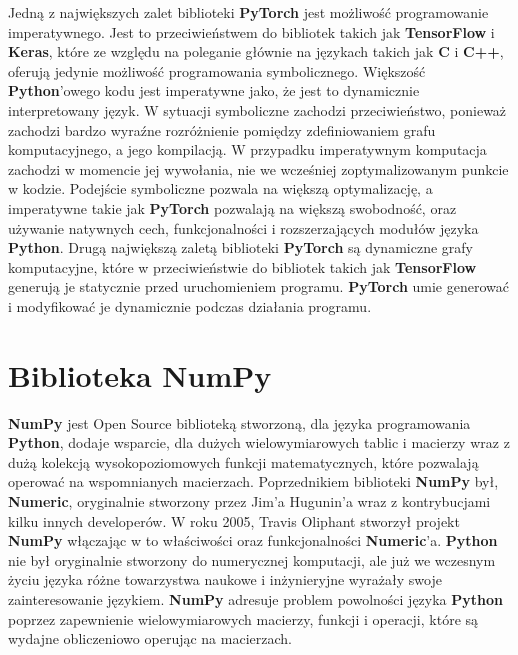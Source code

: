 Jedną z największych zalet biblioteki \textbf{PyTorch} jest możliwość programowanie imperatywnego. Jest to przeciwieństwem do bibliotek takich jak \textbf{TensorFlow} i \textbf{Keras}, które ze względu na poleganie głównie na językach takich jak \textbf{C} i \textbf{C++}, oferują jedynie możliwość programowania symbolicznego. Większość \textbf{Python}'owego kodu jest imperatywne jako, że jest to dynamicznie interpretowany język. W sytuacji symboliczne zachodzi przeciwieństwo, ponieważ zachodzi bardzo wyraźne rozróżnienie pomiędzy zdefiniowaniem grafu komputacyjnego, a jego kompilacją. W przypadku imperatywnym komputacja zachodzi w momencie jej wywołania, nie we wcześniej zoptymalizowanym punkcie w kodzie. Podejście symboliczne pozwala na większą optymalizację, a imperatywne takie jak \textbf{PyTorch} pozwalają na większą swobodność, oraz używanie natywnych cech, funkcjonalności i rozszerzających modułów języka \textbf{Python}.
Drugą największą zaletą biblioteki \textbf{PyTorch} są dynamiczne grafy komputacyjne, które w przeciwieństwie do bibliotek takich jak \textbf{TensorFlow} generują je statycznie przed uruchomieniem programu. \textbf{PyTorch} umie generować i modyfikować je dynamicznie podczas działania programu.

\clearpage

\section{Biblioteka NumPy}
\textbf{NumPy} \cite{PythonForDataAnalysis} \cite{SciPyAndNumPy} \cite{NumPyManual} \cite{WikipediaNumPy} jest Open Source biblioteką stworzoną, dla języka programowania \textbf{Python}, dodaje wsparcie, dla dużych wielowymiarowych tablic i macierzy wraz z dużą kolekcją wysokopoziomowych funkcji matematycznych, które pozwalają operować na wspomnianych macierzach. Poprzednikiem biblioteki \textbf{NumPy} był, \textbf{Numeric}, oryginalnie stworzony przez Jim'a Hugunin'a wraz z kontrybucjami kilku innych developerów. W roku 2005, Travis Oliphant stworzył projekt \textbf{NumPy} włączając w to właściwości oraz funkcjonalności \textbf{Numeric}'a.
\textbf{Python} nie był oryginalnie stworzony do numerycznej komputacji, ale już we wczesnym życiu języka różne towarzystwa naukowe i inżynieryjne wyrażały swoje zainteresowanie językiem.
\textbf{NumPy} adresuje problem powolności języka \textbf{Python} poprzez zapewnienie wielowymiarowych macierzy, funkcji i operacji, które są wydajne obliczeniowo operując na macierzach.


